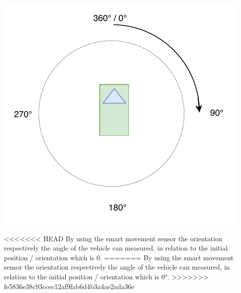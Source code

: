\begin{minipage}{0.5\textwidth}
\centering
	\includegraphics[scale=0.6]{sources/mapping/orientation.pdf}
\end{minipage}
\begin{minipage}{0.5\textwidth}
<<<<<<< HEAD
By using the smart movement sensor the orientation respectively the angle of the vehicle can measured, in relation to the initial position / orientation which is 0\degree.
=======
By using the smart movement sensor the orientation respectively the angle of the vehicle can measured, in relation to the initial position / orientation which is \ang{0}.
>>>>>>> fe5836e38c93ccec12af9fab6d4b3a4ae2ada36e
\end{minipage}

